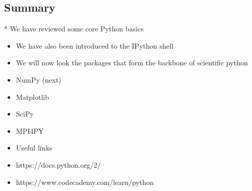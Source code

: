 \documentclass[11pt]{article}
\begin{document}
    

    \subsection{Summary}\label{summary}

 * We have reviewed some core Python basics

\begin{itemize}
\item
  We have also been introduced to the IPython shell
\item
  We will now look the packages that form the backbone of scientific
  python
\item
  NumPy (next)
\item
  Matplotlib
\item
  SciPy
\item
  MPI4PY
\end{itemize}

\begin{itemize}
\item
  Useful links
\item
  https://docs.python.org/2/
\item
  https://www.codecademy.com/learn/python
\end{itemize}


    
    
    
    
\end{document}
